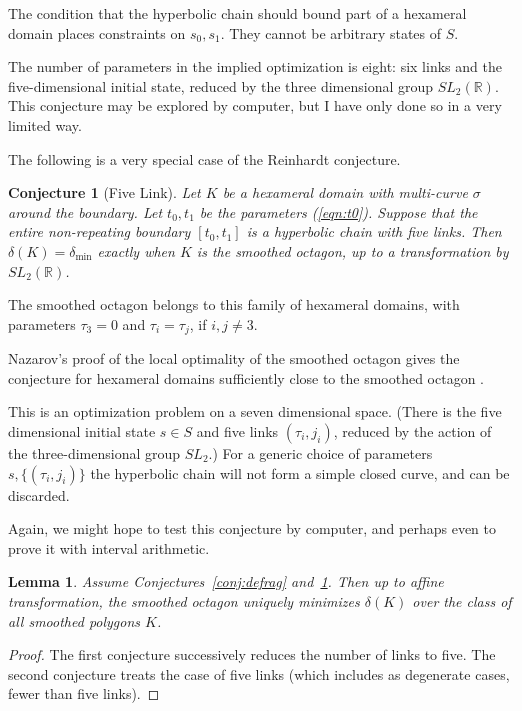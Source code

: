 \documentclass[11pt]{amsart}
\newtheorem{lemma}[equation]{Lemma}
\newtheorem{conj}[equation]{Conjecture}
\newcommand{\ring}[1]{\mathbb{#1}}
\def\deltalat{\mathbb\delta}  %
\def\delt{\delta_{\min}}
\def\rR{{\ring{R}}}
\def\ta{{\tau}}
\begin{document}
The condition that the hyperbolic chain should bound part of a hexameral
domain places constraints on $s_0,s_1$.  They cannot be arbitrary
states of $S$.

The number of parameters in the implied optimization is eight: six
links and the five-dimensional initial state, reduced by the three
dimensional group $SL_2(\rR)$.  This conjecture may be explored by
computer, but I have only done so in a very limited way.

\bigskip

The following is a very special case of the Reinhardt conjecture.

\begin{conj}[Five Link]\label{conj:5} 
  Let $K$ be a hexameral domain with multi-curve $\sigma$ around the
  boundary.  Let $t_0,t_1$ be the parameters (\ref{eqn:t0}).  Suppose
  that the entire non-repeating boundary $[t_0,t_1]$ is a hyperbolic
  chain with five links.  Then $\deltalat(K)= \delt$ exactly when $K$
  is the smoothed octagon, up to a transformation by $SL_2(\rR)$.
\end{conj}

The smoothed octagon belongs to this family of hexameral
domains, with parameters $\ta_3=0$ and $\ta_i=\ta_j$, if $i,j\ne 3$.

Nazarov's proof of the local optimality of the smoothed octagon
gives the conjecture for hexameral domains sufficiently close
to the smoothed octagon \cite{Nazarov}.

This is an optimization problem on a seven dimensional space.  (There
is the five dimensional initial state $s\in S$ and five links
$(\ta_i,j_i)$, reduced by the action of the three-dimensional group
$SL_2$.)  For a generic choice of parameters $s,\{(\ta_i,j_i)\}$ the
hyperbolic chain will not form a simple closed curve, and can be
discarded.

Again, we might hope to test this conjecture by computer, and perhaps
even to prove it with interval arithmetic.

\begin{lemma}\label{lemma:smooth}  
  Assume Conjectures~\ref{conj:defrag} and~\ref{conj:5}.  Then up to
  affine transformation, the smoothed octagon uniquely minimizes
  $\deltalat(K)$ over the class of all smoothed polygons $K$.
\end{lemma}

\begin{proof} The first conjecture successively reduces the number of links to
  five.  The second conjecture treats the case of five links (which
  includes as degenerate cases, fewer than five links).
\end{proof}
\end{document}
